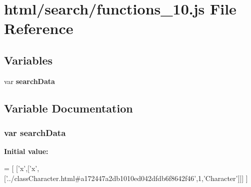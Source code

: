 \section{html/search/functions\-\_\-10.js File Reference}
\label{functions__10_8js}
\subsection*{Variables}
\begin{DoxyCompactItemize}
\item 
var {\bf search\-Data}
\end{DoxyCompactItemize}


\subsection{Variable Documentation}
\subsubsection[{search\-Data}]{\setlength{\rightskip}{0pt plus 5cm}var search\-Data}\label{functions__10_8js_ad01a7523f103d6242ef9b0451861231e}
{\bfseries Initial value\-:}
\begin{DoxyCode}
=
[
  [\textcolor{charliteral}{'x'},[\textcolor{charliteral}{'x'},[\textcolor{stringliteral}{'../classCharacter.html#a172447a2db1010ed042dfdb6f8642f46'},1,\textcolor{stringliteral}{'Character'}]]]
]
\end{DoxyCode}
